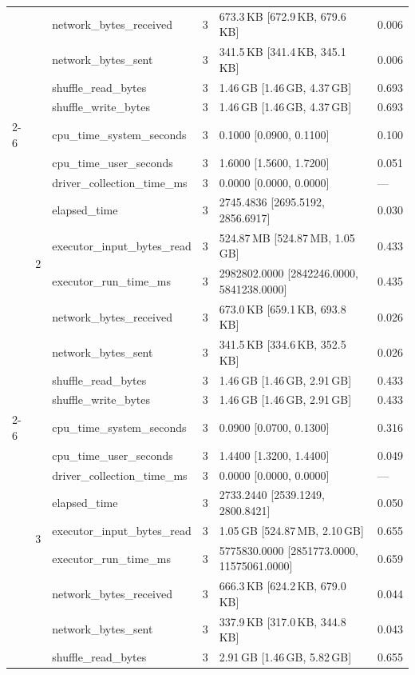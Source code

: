 \begin{tabular}{lllrll}
 &  & network_bytes_received & 3 & 673.3\,KB [672.9\,KB, 679.6\,KB] & 0.006 \\
 &  & network_bytes_sent & 3 & 341.5\,KB [341.4\,KB, 345.1\,KB] & 0.006 \\
 &  & shuffle_read_bytes & 3 & 1.46\,GB [1.46\,GB, 4.37\,GB] & 0.693 \\
 &  & shuffle_write_bytes & 3 & 1.46\,GB [1.46\,GB, 4.37\,GB] & 0.693 \\
\cline{2-6}
 & \multirow[t]{10}{*}{2} & cpu_time_system_seconds & 3 & 0.1000 [0.0900, 0.1100] & 0.100 \\
 &  & cpu_time_user_seconds & 3 & 1.6000 [1.5600, 1.7200] & 0.051 \\
 &  & driver_collection_time_ms & 3 & 0.0000 [0.0000, 0.0000] & --- \\
 &  & elapsed_time & 3 & 2745.4836 [2695.5192, 2856.6917] & 0.030 \\
 &  & executor_input_bytes_read & 3 & 524.87\,MB [524.87\,MB, 1.05\,GB] & 0.433 \\
 &  & executor_run_time_ms & 3 & 2982802.0000 [2842246.0000, 5841238.0000] & 0.435 \\
 &  & network_bytes_received & 3 & 673.0\,KB [659.1\,KB, 693.8\,KB] & 0.026 \\
 &  & network_bytes_sent & 3 & 341.5\,KB [334.6\,KB, 352.5\,KB] & 0.026 \\
 &  & shuffle_read_bytes & 3 & 1.46\,GB [1.46\,GB, 2.91\,GB] & 0.433 \\
 &  & shuffle_write_bytes & 3 & 1.46\,GB [1.46\,GB, 2.91\,GB] & 0.433 \\
\cline{2-6}
 & \multirow[t]{10}{*}{3} & cpu_time_system_seconds & 3 & 0.0900 [0.0700, 0.1300] & 0.316 \\
 &  & cpu_time_user_seconds & 3 & 1.4400 [1.3200, 1.4400] & 0.049 \\
 &  & driver_collection_time_ms & 3 & 0.0000 [0.0000, 0.0000] & --- \\
 &  & elapsed_time & 3 & 2733.2440 [2539.1249, 2800.8421] & 0.050 \\
 &  & executor_input_bytes_read & 3 & 1.05\,GB [524.87\,MB, 2.10\,GB] & 0.655 \\
 &  & executor_run_time_ms & 3 & 5775830.0000 [2851773.0000, 11575061.0000] & 0.659 \\
 &  & network_bytes_received & 3 & 666.3\,KB [624.2\,KB, 679.0\,KB] & 0.044 \\
 &  & network_bytes_sent & 3 & 337.9\,KB [317.0\,KB, 344.8\,KB] & 0.043 \\
 &  & shuffle_read_bytes & 3 & 2.91\,GB [1.46\,GB, 5.82\,GB] & 0.655 \\

\end{tabular}
